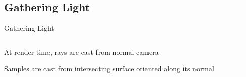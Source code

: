 \documentclass[10pt,compress,professionalfont]{beamer}
\begin{document}
\subsection{Gathering Light}
\begin{frame}{Gathering Light}

    \begin{columns}
        \begin{column}{0.5\textwidth}

    \vspace{-5mm}
    At render time, rays are cast from normal camera\\
    \vspace{8mm}

    Samples are cast from intersecting surface oriented along its normal

        \end{column}
        \begin{column}{0.5\textwidth}
            \includegraphics[width=\textwidth]{../img/diag/orthnormal.pdf}\\
            \vspace{-4mm}
        \end{column}
    \end{columns}

\end{frame}
\end{document}
